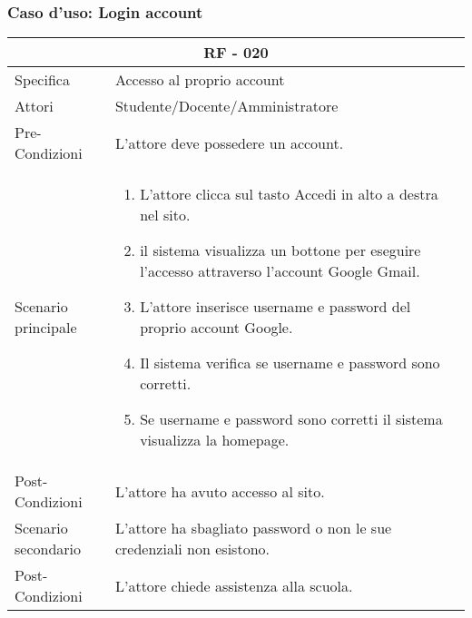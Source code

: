 \documentclass{article}
\begin{document}
\subsubsection{\textbf{Caso d'uso: Login account}}
\begin{tabular}{ |p{3cm}|p{9cm}|  }
	\hline
	\multicolumn{2}{|c|}{\textbf{RF - 020}} \\
	\hline
	Specifica& Accesso al proprio account\\
	\hline
	Attori& Studente/Docente/Amministratore\\
	\hline
	Pre-Condizioni& L'attore deve possedere un account.\\
	\hline
	Scenario principale& \begin{enumerate}
		\item L'attore clicca sul tasto Accedi in alto a destra nel sito.
		\item il sistema visualizza un bottone per eseguire l'accesso attraverso l'account Google Gmail.
		\item L'attore inserisce username e password del proprio account Google.
		\item Il sistema verifica se username e password sono corretti.
		\item Se username e password sono corretti il sistema visualizza la homepage.
	\end{enumerate}\\
	\hline
	Post-Condizioni& L'attore ha avuto accesso al sito.\\
	\hline
	Scenario secondario& L'attore ha sbagliato password o non le sue credenziali non esistono.\\
	\hline
	Post-Condizioni& L'attore chiede assistenza alla scuola.\\
	\hline
\end{tabular}
\end{document}

